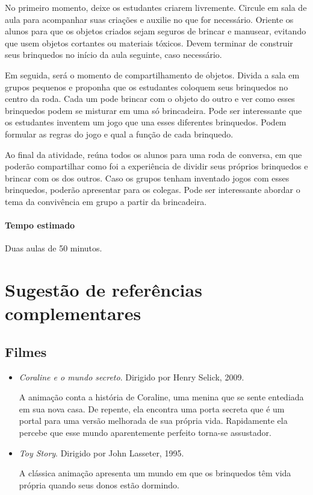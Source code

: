 \documentclass[11pt]{extarticle}
\begin{document}

No primeiro momento, deixe os estudantes criarem livremente. Circule em sala de aula para acompanhar suas criações e auxilie no que for necessário. Oriente os alunos para que os objetos criados sejam seguros de brincar e manusear, evitando que usem objetos cortantes ou materiais tóxicos. Devem terminar de construir seus brinquedos no início da aula seguinte, caso necessário.

Em seguida, será o momento de compartilhamento de objetos. Divida a sala em grupos pequenos e proponha que os estudantes coloquem seus brinquedos no centro da roda. Cada um pode brincar com o objeto do outro e ver como esses brinquedos podem se misturar em uma só brincadeira. Pode ser interessante que os estudantes inventem um jogo que una esses diferentes brinquedos. Podem formular as regras do jogo e qual a função de cada brinquedo.

Ao final da atividade, reúna todos os alunos para uma roda de conversa, em que poderão compartilhar como foi a experiência de dividir seus próprios brinquedos e brincar com os dos outros. Caso os grupos tenham inventado jogos com esses brinquedos, poderão apresentar para os colegas. Pode ser interessante abordar o tema da convivência em grupo a partir da brincadeira.

\paragraph{Tempo estimado} Duas aulas de 50 minutos.

\section{Sugestão de referências complementares}

\subsection{Filmes}

\begin{itemize}

\item \textit{Coraline e o mundo secreto}. Dirigido por Henry Selick, 2009.

A animação conta a história de Coraline, uma menina que se sente entediada em sua nova casa. De repente, ela encontra uma porta secreta que é um portal para uma versão melhorada de sua própria vida. Rapidamente ela percebe que esse mundo aparentemente perfeito torna-se assustador.

\item \textit{Toy Story}. Dirigido por John Lasseter, 1995.

A clássica animação apresenta um mundo em que os brinquedos têm vida própria quando seus donos estão dormindo. 

\end{itemize}
\end{document}
